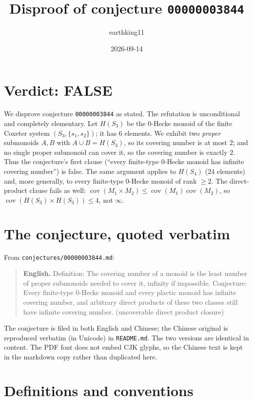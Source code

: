 \documentclass[11pt]{article}
\title{Disproof of conjecture \texttt{00000003844}}
\author{earthking11}
\date{2026-09-14}
\theoremstyle{definition}
\theoremstyle{remark}
\newcommand{\cov}{\operatorname{cov}}
\begin{document}
\maketitle

\section*{Verdict: FALSE}

We disprove conjecture \texttt{00000003844} as stated. The refutation is
unconditional and completely elementary. Let $H(S_3)$ be the $0$-Hecke monoid
of the finite Coxeter system $(S_3,\{s_1,s_2\})$; it has $6$ elements. We
exhibit two \emph{proper} submonoids $A,B$ with $A\cup B=H(S_3)$, so its
covering number is at most $2$; and no single proper submonoid can cover it, so
the covering number is exactly $2$. Thus the conjecture's first clause
(``every finite-type $0$-Hecke monoid has infinite covering number'') is false.
The same argument applies to $H(S_4)$ ($24$ elements) and, more generally, to
every finite-type $0$-Hecke monoid of rank $\ge 2$. The direct-product clause
fails as well: $\cov(M_1\times M_2)\le \cov(M_1)\cov(M_2)$, so
$\cov(H(S_3)\times H(S_3))\le 4$, not $\infty$.

\section{The conjecture, quoted verbatim}

From \texttt{conjectures/00000003844.md}:

\begin{quote}
\textbf{English.} Definition: The covering number of a monoid is the least
number of proper submonoids needed to cover it, infinity if impossible.
Conjecture: Every finite-type 0-Hecke monoid and every plactic monoid has
infinite covering number, and arbitrary direct products of these two classes
still have infinite covering number. (uncoverable direct product closure)
\end{quote}

The conjecture is filed in both English and Chinese; the Chinese original is
reproduced verbatim (in Unicode) in \texttt{README.md}. The two versions are
identical in content. The PDF font does not embed CJK glyphs, so the Chinese
text is kept in the markdown copy rather than duplicated here.

\section{Definitions and conventions}
\end{document}
